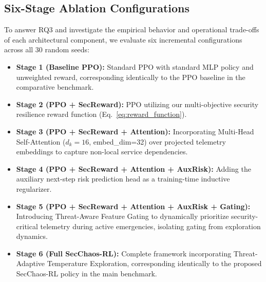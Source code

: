 \documentclass[ASNA,twocolumn]{USG}
\begin{document}
\subsection{Six-Stage Ablation Configurations}
To answer RQ3 and investigate the empirical behavior and operational trade-offs of each architectural component, we evaluate six incremental configurations across all 30 random seeds:
\begin{itemize}
    \item \textbf{Stage 1 (Baseline PPO):} Standard PPO with standard MLP policy and unweighted reward, corresponding identically to the PPO baseline in the comparative benchmark.
    \item \textbf{Stage 2 (PPO + SecReward):} PPO utilizing our multi-objective security resilience reward function (Eq.~\ref{eq:reward_function}).
    \item \textbf{Stage 3 (PPO + SecReward + Attention):} Incorporating Multi-Head Self-Attention ($d_k=16$, embed\_dim=32) over projected telemetry embeddings to capture non-local service dependencies.
    \item \textbf{Stage 4 (PPO + SecReward + Attention + AuxRisk):} Adding the auxiliary next-step risk prediction head as a training-time inductive regularizer.
    \item \textbf{Stage 5 (PPO + SecReward + Attention + AuxRisk + Gating):} Introducing Threat-Aware Feature Gating to dynamically prioritize security-critical telemetry during active emergencies, isolating gating from exploration dynamics.
    \item \textbf{Stage 6 (Full SecChaos-RL):} Complete framework incorporating Threat-Adaptive Temperature Exploration, corresponding identically to the proposed SecChaos-RL policy in the main benchmark.
\end{itemize}
\end{document}
